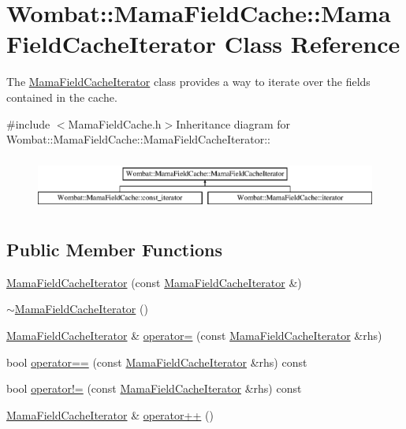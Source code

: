 \hypertarget{classWombat_1_1MamaFieldCache_1_1MamaFieldCacheIterator}{
\section{Wombat::MamaFieldCache::MamaFieldCacheIterator Class Reference}
\label{classWombat_1_1MamaFieldCache_1_1MamaFieldCacheIterator}
}


The {\ttfamily \hyperlink{classWombat_1_1MamaFieldCache_1_1MamaFieldCacheIterator}{MamaFieldCacheIterator}} class provides a way to iterate over the fields contained in the cache.  


{\ttfamily \#include $<$MamaFieldCache.h$>$}Inheritance diagram for Wombat::MamaFieldCache::MamaFieldCacheIterator::\begin{figure}[H]
\begin{center}
\leavevmode
\includegraphics[height=1.78344cm]{classWombat_1_1MamaFieldCache_1_1MamaFieldCacheIterator}
\end{center}
\end{figure}
\subsection*{Public Member Functions}
\begin{DoxyCompactItemize}
\item 
\hyperlink{classWombat_1_1MamaFieldCache_1_1MamaFieldCacheIterator_acf28984526dc916714d0b7bcce620573}{MamaFieldCacheIterator} (const \hyperlink{classWombat_1_1MamaFieldCache_1_1MamaFieldCacheIterator}{MamaFieldCacheIterator} \&)
\item 
\hyperlink{classWombat_1_1MamaFieldCache_1_1MamaFieldCacheIterator_abcbf2f419f126efaadcdfc4af2d7aafd}{$\sim$MamaFieldCacheIterator} ()
\item 
\hyperlink{classWombat_1_1MamaFieldCache_1_1MamaFieldCacheIterator}{MamaFieldCacheIterator} \& \hyperlink{classWombat_1_1MamaFieldCache_1_1MamaFieldCacheIterator_adf1ab9b28b21e86297a0e201803f4d89}{operator=} (const \hyperlink{classWombat_1_1MamaFieldCache_1_1MamaFieldCacheIterator}{MamaFieldCacheIterator} \&rhs)
\item 
bool \hyperlink{classWombat_1_1MamaFieldCache_1_1MamaFieldCacheIterator_a46582789b82491eb9617713785bf5b38}{operator==} (const \hyperlink{classWombat_1_1MamaFieldCache_1_1MamaFieldCacheIterator}{MamaFieldCacheIterator} \&rhs) const 
\item 
bool \hyperlink{classWombat_1_1MamaFieldCache_1_1MamaFieldCacheIterator_abf51da7ad8a7cb2dddf8218c0c277c4b}{operator!=} (const \hyperlink{classWombat_1_1MamaFieldCache_1_1MamaFieldCacheIterator}{MamaFieldCacheIterator} \&rhs) const 
\item 
\hyperlink{classWombat_1_1MamaFieldCache_1_1MamaFieldCacheIterator}{MamaFieldCacheIterator} \& \hyperlink{classWombat_1_1MamaFieldCache_1_1MamaFieldCacheIterator_a7fac373506188f9524bbc69d9e6d06fd}{operator++} ()
\end{DoxyCompactItemize}
